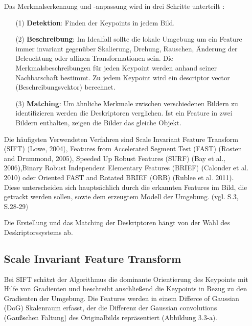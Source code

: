 Das Merkmalserkennung und -anpassung wird in drei Schritte unterteilt \cite{robust_feature}: 

\begin{itemize}
\item[(1)] \textbf{Detektion}: Finden der Keypoints in jedem Bild.
\item[(2)] \textbf{Beschreibung}: Im Idealfall sollte die lokale Umgebung um ein Feature immer invariant gegenüber Skalierung, Drehung, Rauschen, Änderung der Beleuchtung  oder affinen Transformationen sein. Die Merkmalsbeschreibungen für jeden Keypoint werden anhand seiner Nachbarschaft bestimmt. Zu jedem Keypoint wird ein \glqq descriptor vector\grqq{} (Beschreibungsvektor) berechnet.
\item[(3)] \textbf{Matching}: Um ähnliche Merkmale zwischen verschiedenen Bildern zu identifizieren werden die Deskriptoren verglichen. Ist ein Feature in zwei Bildern enthalten, zeigen die Bilder das gleiche Objekt.
\end{itemize}

Die häufigsten Verwendeten Verfahren sind \glqq Scale Invariant Feature Transform\grqq{} (SIFT) (Lowe, 2004), \glqq Features from Accelerated Segment Test\grqq{} (FAST) (Rosten and Drummond, 2005), \glqq Speeded Up Robust Features\grqq{} (SURF) (Bay et al., 2006),\glqq Binary Robust Independent Elementary Features\grqq{} (BRIEF) (Calonder et al. 2010) oder \glqq Oriented FAST and Rotated BRIEF \grqq{} (ORB) (Rublee et al. 2011). Diese unterscheiden sich hauptsächlich durch die erkannten Features im Bild, die getrackt werden sollen, sowie dem erzeugtem Modell der Umgebung. (vgl. \cite{robust_feature} S.3, \cite{natural_feature} S.28-29)


Die Erstellung und das Matching der Deskriptoren hängt von der Wahl des Deskriptorssystems ab.

\subsection{Scale Invariant Feature Transform} 

Bei SIFT schätzt der Algorithmus die dominante Orientierung des Keypoints mit Hilfe von Gradienten und beschreibt anschließend die Keypoints in Bezug zu den Gradienten der Umgebung. Die Features werden in einem \glqq Differce of Gaussian\grqq{} (DoG) Skalenraum erfasst,  der die Differenz der \glqq Gaussian convolutions\grqq{} (Gaußschen Faltung) des Originalbilds repräsentiert (Abbildung 3.3-a).

